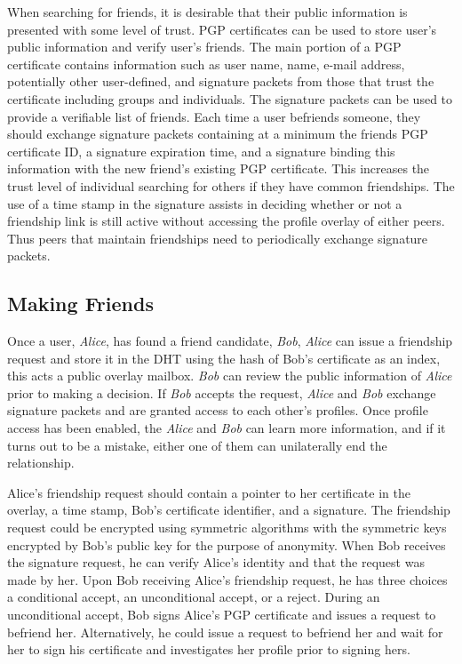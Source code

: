 \documentclass[conference]{IEEEtran}
\begin{document}
When searching for friends, it is desirable that their public information is
presented with some level of trust.  PGP certificates can be used to store
user's public information and verify user's friends.  The main portion of a PGP
certificate contains information such as user name, name, e-mail address,
potentially other user-defined, and signature packets from those that trust the
certificate including groups and individuals.  The signature packets can be
used to provide a verifiable list of friends.  Each time a user befriends
someone, they should exchange signature packets containing at a minimum the
friends PGP certificate ID, a signature expiration time, and a signature
binding this information with the new friend's existing PGP certificate.  This
increases the trust level of individual searching for others if they have
common friendships.  The use of a time stamp in the signature assists in
deciding whether or not a friendship link is still active without accessing the
profile overlay of either peers.  Thus peers that maintain friendships need to
periodically exchange signature packets.

\subsection{Making Friends}

Once a user, \textit{Alice}, has found a friend candidate, \textit{Bob},
\textit{Alice} can issue a friendship request and store it in the DHT using the
hash of Bob's certificate as an index, this acts a public overlay mailbox.
\textit{Bob} can review the public information of \textit{Alice} prior to
making a decision.  If \textit{Bob} accepts the request, \textit{Alice} and
\textit{Bob} exchange signature packets and are granted access to each other's
profiles.  Once profile access has been enabled, the \textit{Alice} and
\textit{Bob} can learn more information, and if it turns out to be a mistake,
either one of them can unilaterally end the relationship.

Alice's friendship request should contain a pointer to her certificate in the
overlay, a time stamp, Bob's certificate identifier, and a signature.  The
friendship request could be encrypted using symmetric algorithms with the
symmetric keys encrypted by Bob's public key for the purpose of anonymity.
When Bob receives the signature request, he can verify Alice's identity and
that the request was made by her.  Upon Bob receiving Alice's friendship
request, he has three choices a conditional accept, an unconditional accept, or
a reject.  During an unconditional accept, Bob signs Alice's PGP certificate
and issues a request to befriend her.  Alternatively, he could issue a request
to befriend her and wait for her to sign his certificate and investigates her
profile prior to signing hers.
\end{document}
